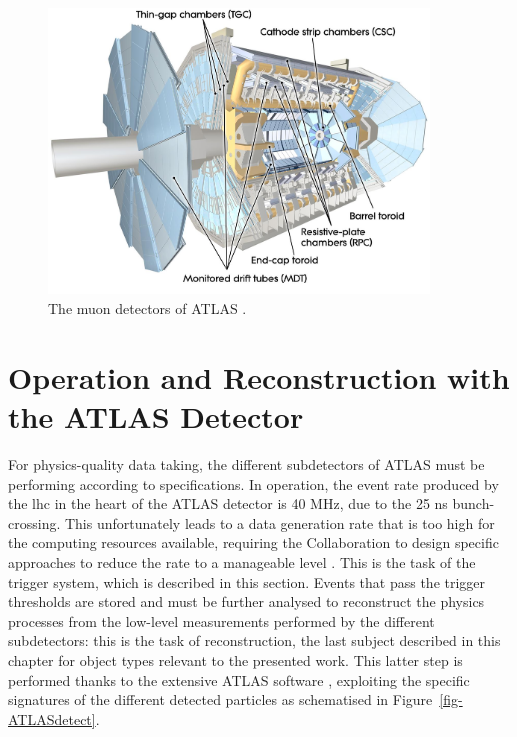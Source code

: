 \begin{figure}[!h]
  \centering
  \includegraphics[width=0.9\textwidth]{Images/ATLAS/ATLASMuon.jpg}
  \caption{The muon detectors of ATLAS \cite{ATLASschematics}.}
  \label{fig-AtlasDecMuon}
\end{figure}

\section{Operation and Reconstruction with the ATLAS Detector}\label{chap-atlas-reco}
For physics-quality data taking, the different subdetectors of ATLAS must be performing according to specifications. In operation, the event rate produced by the \gls{lhc} in the heart of the ATLAS detector is 40 MHz, due to the 25 ns bunch-crossing. This unfortunately leads to a data generation rate that is too high for the computing resources available, requiring the Collaboration to design specific approaches to reduce the rate to a manageable level \cite{Nedden_2017}. This is the task of the trigger system, which is described in this section. Events that pass the trigger thresholds are stored and must be further analysed to reconstruct the physics processes from the low-level measurements performed by the different subdetectors: this is the task of reconstruction, the last subject described in this chapter for object types relevant to the presented work. This latter step is performed thanks to the extensive ATLAS software \cite{ATL-SOFT-PUB-2021-001, ATL-SOFT-PUB-2020-001}, exploiting the specific signatures of the different detected particles as schematised in Figure~\ref{fig-ATLASdetect}.

